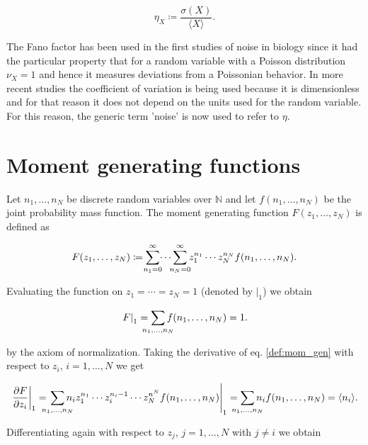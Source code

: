 \begin{equation}
  \label{eq:con-cv_def}
  \eta_X \coloneqq \frac{\sigma(X)}{\langle X \rangle}.
\end{equation}

The Fano factor has been used in the first studies of noise in biology since it had the particular property that for a random variable with a Poisson distribution $\nu_X=1$ and hence it measures deviations from a Poissonian behavior. In more recent studies the coefficient of variation is being used because it is dimensionless and for that reason it does not depend on the units used for the random variable. For this reason, the generic term 'noise' is now used to refer to $\eta$.

\section{Moment generating functions}

Let $n_1,\dotsc,n_N$ be discrete random variables over $\mathbb{N}$ and let $f(n_1,\dotsc,n_N)$ be the joint probability mass function. The moment generating function $F(z_1,\dotsc,z_N)$ is defined as

\begin{equation}
\label{def:mom_gen}
F(z_1,\dotsc,z_N) \coloneqq \sum_{\mathclap{n_1=0}}^{\infty} \dotsi \sum_{\mathclap{n_N=0}}^{\infty} z_1^{n_1} \dotsm z_N^{n_N} f(n_1,\dotsc,n_N).
\end{equation}

Evaluating the function on $z_1 = \dotsb = z_N = 1$ (denoted by $\left. \right|_1$) we obtain

\begin{equation*}
\left.F\right|_1 = \sum_{\mathclap{n_1,\dotsc,n_N}}f(n_1,\dotsc,n_N) = 1.
\end{equation*}

by the axiom of normalization. Taking the derivative of eq. \ref{def:mom_gen} with respect to $z_i$, $i = 1,\dotsc,N$ we get

\begin{equation*}
\left.\frac{\partial F}{\partial z_i}\right|_1 = \left.\sum_{\mathclap{n_1,\dotsc,n_N}}n_i z_1^{n_1}\dotsm z_i^{n_i-1}\dotsm z_N^{n^N}f(n_1,\dotsc,n_N)\right|_1 = \sum_{\mathclap{n_1,\dotsc,n_N}} n_i f(n_1,\dotsc,n_N) = \langle n_i \rangle.
\end{equation*}

Differentiating again with respect to $z_j$, $j=1,\dotsc,N$ with $j\neq i$ we obtain

